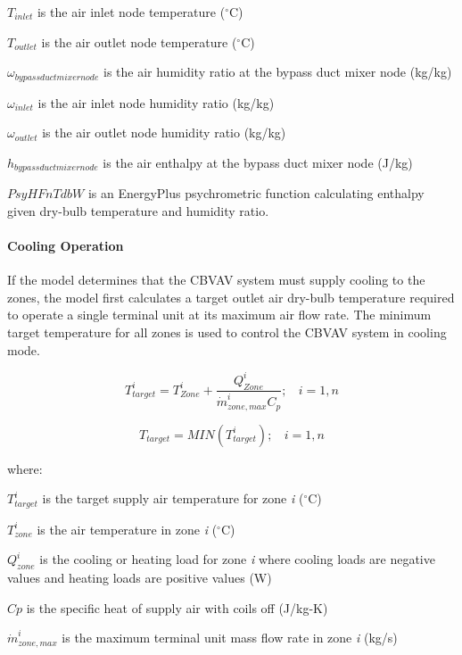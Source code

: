 \({T_{inlet}}\) is the air inlet node temperature (\(^{\circ}\)C)

\({T_{outlet}}\) is the air outlet node temperature (\(^{\circ}\)C)

\({\omega_{bypassductmixernode}}\) is the air humidity ratio at the bypass duct mixer node (kg/kg)

\({\omega_{inlet}}\) is the air inlet node humidity ratio (kg/kg)

\({\omega_{outlet}}\) is the air outlet node humidity ratio (kg/kg)

\({h_{bypassductmixernode}}\) is the air enthalpy at the bypass duct mixer node (J/kg)

\(PsyHFnTdbW\) is an EnergyPlus psychrometric function calculating enthalpy given dry-bulb temperature and humidity ratio.

\paragraph{Cooling Operation}\label{cooling-operation}

If the model determines that the CBVAV system must supply cooling to the zones, the model first calculates a target outlet air dry-bulb temperature required to operate a single terminal unit at its maximum air flow rate. The minimum target temperature for all zones is used to control the CBVAV system in cooling mode.

\begin{equation}
  T_{target}^i = T_{Zone}^i + \frac{Q_{Zone}^i}{\dot{m}_{zone,max}^i C_p};~~~~i = 1,n
\end{equation}

\begin{equation}
{T_{target}} = MIN\left( {T_{target}^i} \right);~~~~i = 1,n
\end{equation}

where:

\(T_{target}^i\) is the target supply air temperature for zone \emph{i} (\(^{\circ}\)C)

\(T_{zone}^i\) is the air temperature in zone \emph{i} (\(^{\circ}\)C)

\(Q_{zone}^i\) is the cooling or heating load for zone \emph{i} where cooling loads are negative values and heating loads are positive values (W)

\(Cp\) is the specific heat of supply air with coils off (J/kg-K)

\(\dot m_{zone,max}^i\) is the maximum terminal unit mass flow rate in zone \emph{i} (kg/s)

